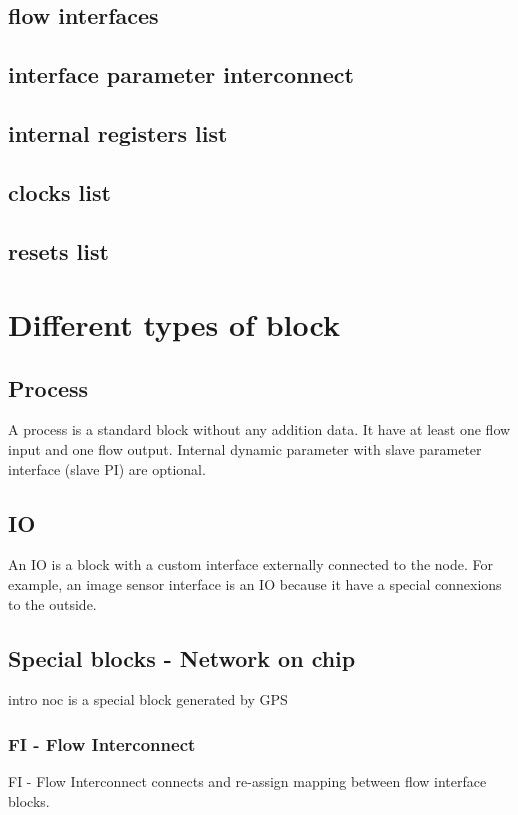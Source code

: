 \subsection{flow interfaces}
\subsection{interface parameter interconnect}
\subsection{internal registers list}
\subsection{clocks list}
\subsection{resets list}


\section{Different types of block}
\subsection{Process}
A process is a standard block without any addition data. It have at least one flow input and one flow output. Internal dynamic parameter with slave parameter interface (slave PI) are optional.

\subsection{IO}
An IO is a block with a custom interface externally connected to the node. For example, an image sensor interface is an IO because it have a special connexions to the outside.

\subsection{Special blocks - Network on chip}

intro noc
is a special block generated by GPS
\subsubsection{FI - Flow Interconnect}
FI - Flow Interconnect connects and re-assign mapping between flow interface blocks.

